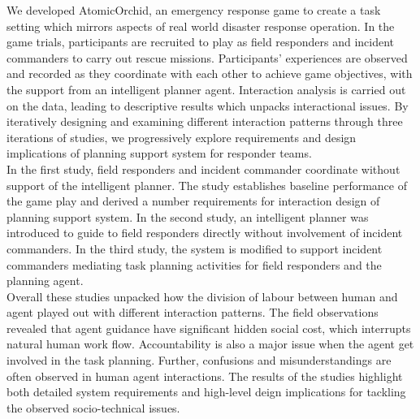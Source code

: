 We developed AtomicOrchid, an emergency response game to create a task setting which mirrors aspects of real world disaster response operation. In the game trials, participants are recruited to play as field responders and incident commanders to carry out rescue missions. Participants' experiences are observed and recorded as they coordinate with each other to achieve game objectives, with the support from an intelligent planner agent. Interaction analysis is carried out on the data, leading to descriptive results which unpacks interactional issues. By iteratively designing and examining different interaction patterns through three iterations of studies, we progressively explore requirements and design implications of planning support system for responder teams.\\

In the first study, field responders and incident commander coordinate without support of the intelligent planner. The study establishes baseline performance of the game play and derived a number requirements for interaction design of planning support system. In the second study, an intelligent planner was introduced to guide to field responders directly without involvement of incident commanders. In the third study, the system is modified to support incident commanders mediating task planning activities for field responders and the planning agent. \\

Overall these studies unpacked how the division of labour between human and agent played out with different interaction patterns. The field observations revealed that agent guidance have significant hidden social cost, which interrupts natural human work flow. Accountability is also a major issue when the agent get involved in the task planning. Further, confusions and misunderstandings are often observed in human agent interactions. The results of the studies highlight both detailed system requirements and high-level deign implications for tackling the observed socio-technical issues.\\  


\endgroup			

\vfill